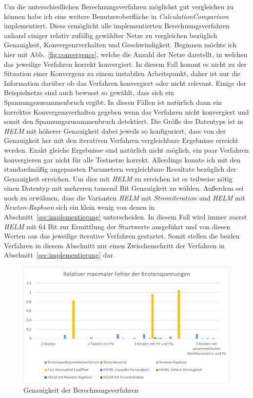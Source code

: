 \documentclass[12pt,a4paper]{article}
\newcommand{\reffig}[1]{{Abb.~\ref{#1}}}
\newcommand{\refsec}[1]{{Abschnitt~\ref{#1}}}
\begin{document}
	Um die unterschiedlichen Berechnungsverfahren möglichst gut vergleichen zu können habe ich eine weitere Benutzeroberfläche in \emph{CalculationComparison} implementiert. Diese ermöglicht alle implementierten Berechnungsverfahren anhand einiger relativ zufällig gewählter Netze zu vergleichen bezüglich Genauigkeit, Konvergenzverhalten und Geschwindigkeit. Beginnen möchte ich hier mit \reffig{fig:convergence}, welche die Anzahl der Netze darstellt, in welchen das jeweilige Verfahren korrekt konvergiert. In diesem Fall kommt es nicht zu der Situation einer Konvergenz zu einem instabilen Arbeitspunkt, daher ist nur die Information darüber ob das Verfahren konvergiert oder nicht relevant. Einige der Beispielnetze sind auch bewusst so gewählt, dass sich ein Spannungszusammenbruch ergibt. In diesen Fällen ist natürlich dann ein korrektes Konvergenzverhalten gegeben wenn das Verfahren nicht konvergiert und somit den Spannungszusammenbruch detektiert. Die Größe des Datentyps ist in \emph{HELM} mit höherer Genauigkeit dabei jeweils so konfiguriert, dass von der Genauigkeit her mit den iterativen Verfahren vergleichbare Ergebnisse erreicht werden. Exakt gleiche Ergebnisse sind natürlich nicht möglich, ein paar Verfahren konvergieren gar nicht für alle Testnetze korrekt. Allerdings konnte ich mit den standardmäßig angepassten Parametern vergleichbare Resultate bezüglich der Genauigkeit erreichen. Um dies mit \emph{HELM} zu erreichen ist es teilweise nötig einen Datentyp mit mehreren tausend Bit Genauigkeit zu wählen. Außerdem sei noch zu erwähnen, dass die Varianten \emph{HELM} mit \emph{Stromiteration} und \emph{HELM} mit \emph{Newton-Raphson} sich ein klein wenig von denen in \refsec{sec:implementierung} unterscheiden. In diesem Fall wird immer zuerst \emph{HELM} mit 64 Bit zur Ermittlung der Startwerte ausgeführt und von diesen Werten aus das jeweilige iterative Verfahren gestartet. Somit stellen die beiden Verfahren in diesem Abschnitt nur einen Zwischenschritt der Verfahren in \refsec{sec:implementierung} dar.
	
	\begin{figure}
		\centering
		\includegraphics[scale=0.8]{pictures/precision_1}
		\caption{Genauigkeit der Berechnungsverfahren}
		\label{fig:precision_1}
	\end{figure}
	
\end{document}
